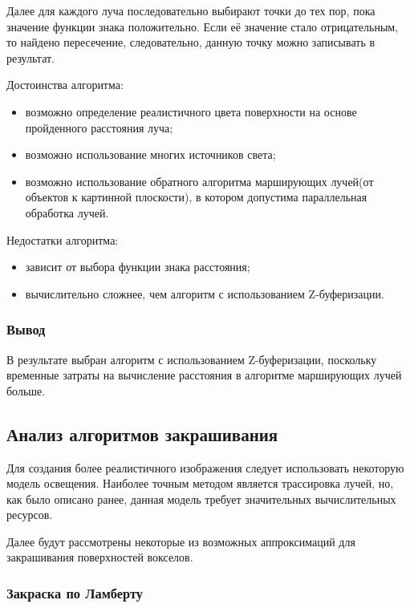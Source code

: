 Далее для каждого луча последовательно выбирают точки до тех пор, пока значение функции знака положительно. Если её значение стало отрицательным, то найдено пересечение, следовательно, данную точку можно записывать в результат.

Достоинства алгоритма:
\begin{itemize}
    \item возможно определение реалистичного цвета поверхности на основе пройденного расстояния луча;
    \item возможно использование многих источников света;
    \item возможно использование обратного алгоритма марширующих лучей(от объектов к картинной плоскости), в котором допустима параллельная обработка лучей.
\end{itemize}

Недостатки алгоритма:
\begin{itemize}
    \item зависит от выбора функции знака расстояния;
    \item вычислительно сложнее, чем алгоритм с использованием Z-буферизации\cite{site:raymarching}.
\end{itemize}

\subsubsection{Вывод}

В результате выбран алгоритм с использованием Z-буферизации, поскольку временные
затраты на вычисление расстояния в алгоритме марширующих лучей больше.

\subsection{Анализ алгоритмов закрашивания}

Для создания более реалистичного изображения следует использовать некоторую модель освещения.
Наиболее точным методом является трассировка лучей\cite{site:raymarching}, но, как было описано ранее, данная модель требует значительных вычислительных ресурсов.

Далее будут рассмотрены некоторые из возможных аппроксимаций для закрашивания поверхностей вокселов.

\subsubsection{Закраска по Ламберту}

